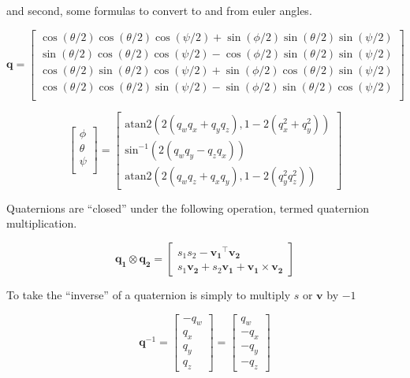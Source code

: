 \documentclass[paper=a4, fontsize=11pt]{scrartcl} %
\numberwithin{equation}{section} %
\numberwithin{figure}{section} %
\numberwithin{table}{section} %
\begin{document}
and second, some formulas to convert to and from euler angles.


\begin{equation}
	\bm{q} =
	  \begin{bmatrix}
	  	\cos(\theta/2)\cos(\theta/2)\cos(\psi/2) + \sin(\phi/2)\sin(\theta/2)\sin(\psi/2) \\
	  	\sin(\theta/2)\cos(\theta/2)\cos(\psi/2) - \cos(\phi/2)\sin(\theta/2)\sin(\psi/2) \\
	  	\cos(\theta/2)\sin(\theta/2)\cos(\psi/2) + \sin(\phi/2)\cos(\theta/2)\sin(\psi/2) \\
	  	\cos(\theta/2)\cos(\theta/2)\sin(\psi/2) - \sin(\phi/2)\sin(\theta/2)\cos(\psi/2) \\
	  \end{bmatrix}
\end{equation}

\begin{equation}
	\begin{bmatrix}
		\phi \\
		\theta \\
		\psi \\
	\end{bmatrix}
	=
	\begin{bmatrix}
		\textrm{atan2}\left( 2\left(q_wq_x + q_yq_z\right),1-2\left(q_x^2+q_y^2\right) \right) \\
		\textrm{sin}^{-1}\left( 2 \left( q_wq_y - q_zq_x \right)  \right) \\
		\textrm{atan2}\left( 2 \left( q_wq_z + q_xq_y \right), 1 - 2 \left( q_y^2 q_z^2 \right)  \right)
	\end{bmatrix}
	\label{eq:euler_from_quat}
\end{equation}

Quaternions are ``closed'' under the following operation, termed quaternion multiplication.

\begin{equation}
	\bm{q_1} \otimes \bm{q_2} = \begin{bmatrix}
									s_1s_2 - \bm{v_1}^\top\bm{v_2} \\
									s_1\bm{v_2} + s_2\bm{v_1} + \bm{v_1} \times \bm{v_2}
								\end{bmatrix}
\end{equation}

To take the ``inverse'' of a quaternion is simply to multiply $s$ or $\bm{v}$ by $-1$

\begin{equation}
	\bm{q}^{-1} = \begin{bmatrix}
				-q_w \\
				q_x \\
				q_y \\
				q_z
			 \end{bmatrix}
			 	= \begin{bmatrix}
				q_w \\
				-q_x \\
				-q_y \\
				-q_z
			 \end{bmatrix}
\end{equation}
\end{document}
